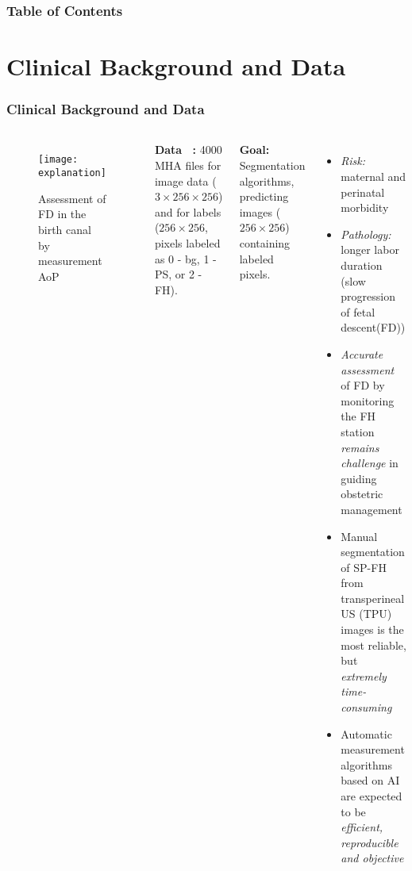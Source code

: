  




\frame{\titlepage}

\begin{frame}
    \frametitle{Table of Contents}
    \tableofcontents
    \end{frame}

\section{Clinical Background and Data}

\begin{frame}
    \frametitle{Clinical Background and Data}
\begin{columns}
    \vspace{-4mm}
    \begin{figure}[H]
        \texttt{[image: explanation]}
        \vspace{-7mm}
        \caption{Assessment of FD in the birth canal by measurement AoP}
    \end{figure}
    \small
    \vspace{-5mm}
    \textbf{Data ~\cite{LU2022107904}:}
    4000 MHA files for image data ($3\times256\times256$)
    and for labels ($256\times256$, pixels labeled as 
    0 - bg, 1 - PS, or 2 - FH).

    \textbf{Goal:}
    Segmentation algorithms, predicting images ($256\times256$) containing
    labeled pixels.


    \small
    \begin{itemize}
        \item \textit{Risk:} maternal and perinatal morbidity 
        \item \textit{Pathology:} longer labor duration 
        (slow progression of fetal descent(FD))
        \item \textit{Accurate assessment} of FD by 
        monitoring the FH station \textit{remains challenge} 
        in guiding obstetric management
        \item Manual segmentation of SP-FH from transperineal US (TPU)
        images is the most reliable, but \textit{extremely time-consuming} 
        \item Automatic measurement algorithms based on AI are 
        expected to be \textit{efficient, reproducible and objective} 
    \end{itemize}
    \end{columns}
\end{frame}


